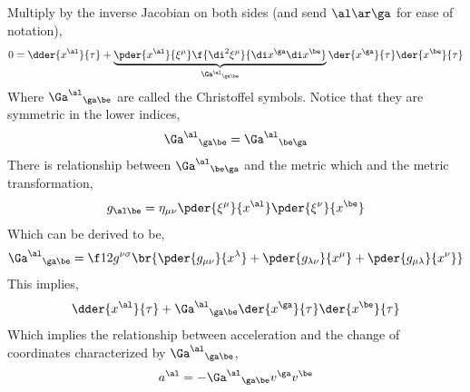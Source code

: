 \documentclass{article}
\begin{document}
Multiply by the inverse Jacobian on both sides (and send $\al \ar \ga$ for ease of notation),
\[ 0 = \dder{x^\al}{\tau}  + \underbrace{\pder{x^\al}{\xi^\mu} \f{\di^2\xi^\mu}{\di x^\ga\di x^\be}}_{{\Ga^\al}_{\ga\be}}\der{x^\ga}{\tau}\der{x^\be}{\tau} \]
Where ${\Ga^\al}_{\ga\be}$ are called the Christoffel symbols. Notice that they are symmetric in the lower indices,
\[ {\Ga^\al}_{\ga\be} = {\Ga^\al}_{\be\ga} \]
There is relationship between ${\Ga^\al}_{\be\ga}$ and the metric which and the metric transformation,
\[ g_{\al\be} = \eta_{\mu\nu} \pder{\xi^\mu}{x^\al}\pder{\xi^\nu}{x^\be} \]
Which can be derived to be,
\[ {\Ga^\al}_{\ga\be} = \f12 g^{\nu\sigma}\br{\pder{g_{\mu\nu}}{x^\lambda} + \pder{g_{\lambda\nu}}{x^\mu} + \pder{g_{\mu\lambda}}{x^\nu}} \]
This implies,
\[ \dder{x^\al}{\tau} + {\Ga^\al}_{\ga\be} \der{x^\ga}{\tau} \der{x^\be}{\tau} \]
Which implies the relationship between acceleration and the change of coordinates characterized by ${\Ga^\al}_{\ga\be}$,
\[ a^\al = - {\Ga^\al}_{\ga\be}  v^\ga  v^\be\]
\end{document}

